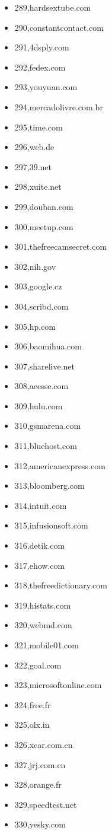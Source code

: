 \begin{multicols}{3}
\begin{itemize}
	\item 289,hardsextube.com
	\item 290,constantcontact.com
	\item 291,4dsply.com
	\item 292,fedex.com
	\item 293,youyuan.com
	\item 294,mercadolivre.com.br
	\item 295,time.com
	\item 296,web.de
	\item 297,39.net
	\item 298,xuite.net
	\item 299,douban.com
	\item 300,meetup.com
	\item 301,thefreecamsecret.com
	\item 302,nih.gov
	\item 303,google.cz
	\item 304,scribd.com
	\item 305,hp.com
	\item 306,baomihua.com
	\item 307,sharelive.net
	\item 308,acesse.com
	\item 309,hulu.com
	\item 310,gsmarena.com
	\item 311,bluehost.com
	\item 312,americanexpress.com
	\item 313,bloomberg.com
	\item 314,intuit.com
	\item 315,infusionsoft.com
	\item 316,detik.com
	\item 317,ehow.com
	\item 318,thefreedictionary.com
	\item 319,histats.com
	\item 320,webmd.com
	\item 321,mobile01.com
	\item 322,goal.com
	\item 323,microsoftonline.com
	\item 324,free.fr
	\item 325,olx.in
	\item 326,xcar.com.cn
	\item 327,jrj.com.cn
	\item 328,orange.fr
	\item 329,speedtest.net
	\item 330,yesky.com

\end{itemize}
\end{multicols}
